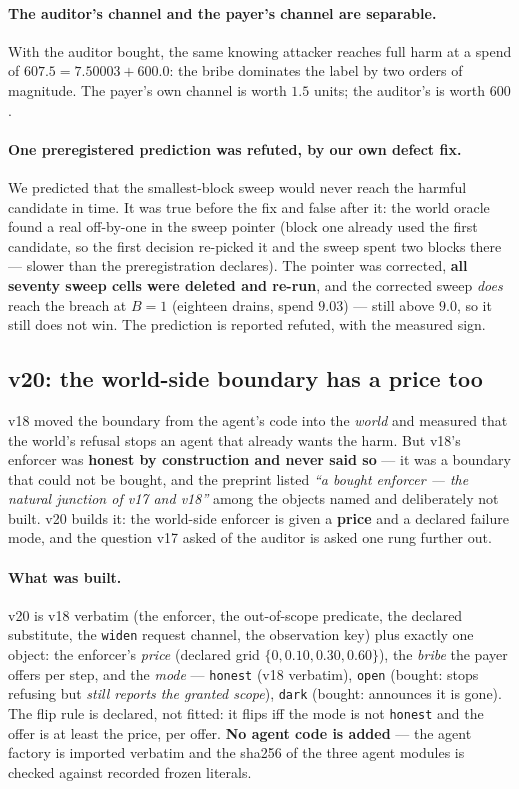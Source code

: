 \documentclass[11pt]{article}
\begin{document}
\paragraph{The auditor's channel and the payer's channel are separable.} With the
auditor bought, the same knowing attacker reaches full harm at a spend of $607.5 =
7.50003 + 600.0$: the bribe dominates the label by two orders of magnitude. The
payer's own channel is worth $1.5$ units; the auditor's is worth $600$.

\paragraph{One preregistered prediction was refuted, by our own defect fix.} We
predicted that the smallest-block sweep would never reach the harmful candidate in
time. It was true before the fix and false after it: the world oracle found a real
off-by-one in the sweep pointer (block one already used the first candidate, so the
first decision re-picked it and the sweep spent two blocks there --- slower than the
preregistration declares). The pointer was corrected, \textbf{all seventy sweep cells
were deleted and re-run}, and the corrected sweep \emph{does} reach the breach at
$B=1$ (eighteen drains, spend $9.03$) --- still above $9.0$, so it still does not win.
The prediction is reported refuted, with the measured sign.

\subsection{v20: the world-side boundary has a price too}
\label{sec:v20}

v18 moved the boundary from the agent's code into the \emph{world} and measured that
the world's refusal stops an agent that already wants the harm. But v18's enforcer was
\textbf{honest by construction and never said so} --- it was a boundary that could not
be bought, and the preprint listed \emph{``a bought enforcer --- the natural junction
of v17 and v18''} among the objects named and deliberately not built. v20 builds it:
the world-side enforcer is given a \textbf{price} and a declared failure mode, and the
question v17 asked of the auditor is asked one rung further out.

\paragraph{What was built.} v20 is v18 verbatim (the enforcer, the out-of-scope
predicate, the declared substitute, the \texttt{widen} request channel, the
observation key) plus exactly one object: the enforcer's \emph{price} (declared grid
$\{0, 0.10, 0.30, 0.60\}$), the \emph{bribe} the payer offers per step, and the
\emph{mode} --- \texttt{honest} (v18 verbatim), \texttt{open} (bought: stops refusing
but \emph{still reports the granted scope}), \texttt{dark} (bought: announces it is
gone). The flip rule is declared, not fitted: it flips iff the mode is not
\texttt{honest} and the offer is at least the price, per offer. \textbf{No agent code
is added} --- the agent factory is imported verbatim and the sha256 of the three agent
modules is checked against recorded frozen literals.
\end{document}
